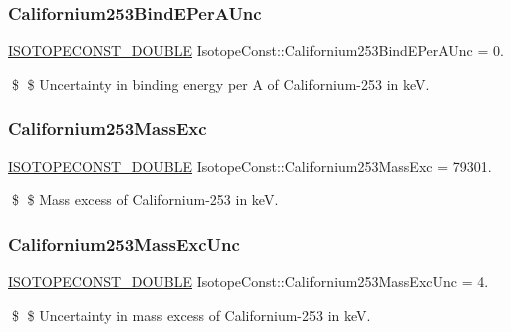 \subsubsection{\texorpdfstring{Californium253\+Bind\+E\+Per\+A\+Unc}{Californium253BindEPerAUnc}}
{\footnotesize\ttfamily \mbox{\hyperlink{group___isotope_const-_macros_ga8f45a7272ce02c0b4c65c44636ed719a}{I\+S\+O\+T\+O\+P\+E\+C\+O\+N\+S\+T\+\_\+\+D\+O\+U\+B\+LE}} Isotope\+Const\+::\+Californium253\+Bind\+E\+Per\+A\+Unc = 0.}

\$ \$ Uncertainty in binding energy per A of Californium-\/253 in keV. \mbox{\label{group___isotope_const-_californium-_cf253_ga6fe16df9e400627d1994b78039720c25}} 
\subsubsection{\texorpdfstring{Californium253\+Mass\+Exc}{Californium253MassExc}}
{\footnotesize\ttfamily \mbox{\hyperlink{group___isotope_const-_macros_ga8f45a7272ce02c0b4c65c44636ed719a}{I\+S\+O\+T\+O\+P\+E\+C\+O\+N\+S\+T\+\_\+\+D\+O\+U\+B\+LE}} Isotope\+Const\+::\+Californium253\+Mass\+Exc = 79301.}

\$ \$ Mass excess of Californium-\/253 in keV. \mbox{\label{group___isotope_const-_californium-_cf253_gaf0cdddabe5c4ef2aca6a744c25e5d3a8}} 
\subsubsection{\texorpdfstring{Californium253\+Mass\+Exc\+Unc}{Californium253MassExcUnc}}
{\footnotesize\ttfamily \mbox{\hyperlink{group___isotope_const-_macros_ga8f45a7272ce02c0b4c65c44636ed719a}{I\+S\+O\+T\+O\+P\+E\+C\+O\+N\+S\+T\+\_\+\+D\+O\+U\+B\+LE}} Isotope\+Const\+::\+Californium253\+Mass\+Exc\+Unc = 4.}

\$ \$ Uncertainty in mass excess of Californium-\/253 in keV. \mbox{\label{group___isotope_const-_californium-_cf253_gabf697afd09bfad8664b608567596ede8}} 

